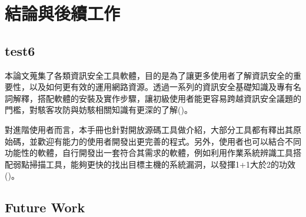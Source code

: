 
\chapter{結論與後續工作}
\label{cha:work} 

\section{test6}
\label{sec:test6}


本論文蒐集了各類資訊安全工具軟體，目的是為了讓更多使用者了解資訊安全的重要性，以及如何更有效的運用網路資源。透過一系列的資訊安全基礎知識及專有名詞解釋，搭配軟體的安裝及實作步驟，讓初級使用者能更容易跨越資訊安全議題的門檻，對駭客攻防與妨駭相關知識有更深的了解(\cite{Guo2021})。

對進階使用者而言，本手冊也針對開放源碼工具做介紹，大部分工具都有釋出其原始碼，並歡迎有能力的使用者開發出更完善的程式。另外，使用者也可以結合不同功能性的軟體，自行開發出一套符合其需求的軟體，例如利用作業系統辨識工具搭配弱點掃描工具，能夠更快的找出目標主機的系統漏洞，以發揮1+1大於2的功效(\cite{test1})。

\section{Future Work} 
